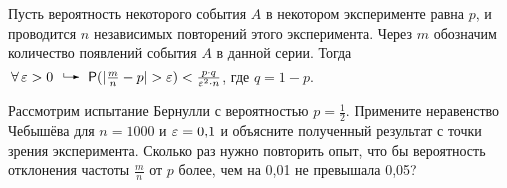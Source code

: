 \documentclass[a4paper,12pt]{article}
\begin{document}
  Пусть вероятность некоторого события $A$ в некотором эксперименте равна $p$, и проводится $n$ независимых повторений этого эксперимента. Через $m$ обозначим количество появлений события $A$ в данной серии. Тогда $\fa\ep>0\exec\Pf(|\frac{m}{n}-p|>\ep)<\frac{p\cdot q}{\ep^2\cdot n}$, где $q=1-p$.

  Рассмотрим испытание Бернулли с вероятностью $p=\frac{1}{2}$.
   Примените неравенство Чебышёва для $n=1000$ и $\varepsilon=0{,}1$ и объясните полученный результат с точки зрения эксперимента.
   Сколько раз нужно повторить опыт, что бы вероятность отклонения частоты $\frac{m}{n}$ от $p$ более, чем на 0,01 не превышала 0,05?

\end{document}
